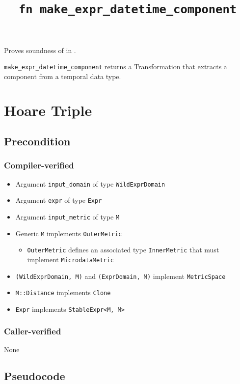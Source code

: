 \documentclass{article}
\title{\texttt{fn make\_expr\_datetime\_component}}
\author{\MichaelShoemateAuthor}
\date{}
\begin{document}
\maketitle

\contrib
Proves soundness of  in .

\texttt{make\_expr\_datetime\_component} returns a Transformation that extracts a component from a temporal data type.

\section{Hoare Triple}
\subsection*{Precondition}
\subsubsection*{Compiler-verified}
\begin{itemize}
    \item Argument \texttt{input\_domain} of type \texttt{WildExprDomain}
    \item Argument \texttt{expr} of type \texttt{Expr}
    \item Argument \texttt{input\_metric} of type \texttt{M}
    \item Generic \texttt{M} implements \texttt{OuterMetric}
    \begin{itemize}
        \item \texttt{OuterMetric} defines an associated type \texttt{InnerMetric} that must implement \texttt{MicrodataMetric}
    \end{itemize}
    \item \texttt{(WildExprDomain, M)} and \texttt{(ExprDomain, M)} implement \texttt{MetricSpace}
    \item \texttt{M::Distance} implements \texttt{Clone}
    \item \texttt{Expr} implements \texttt{StableExpr<M, M>}
\end{itemize}

\subsubsection*{Caller-verified}
None

\subsection*{Pseudocode}

\end{document}

